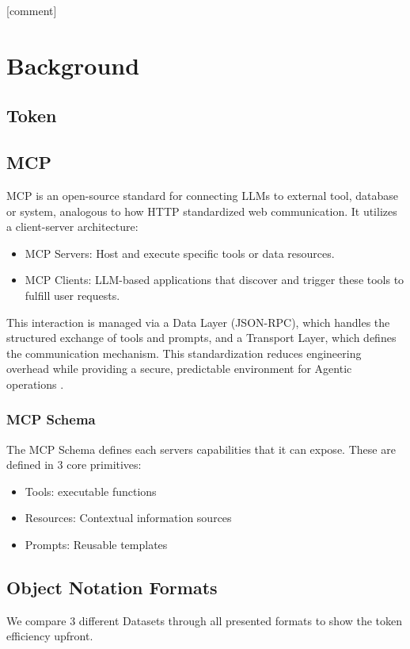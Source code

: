 \documentclass[10pt,twocolumn,letterpaper]{article}
\begin{document}
[comment]

\section{Background}
\subsection{Token}


\subsection{MCP}

MCP is an open-source standard for connecting LLMs to external tool, database or system, analogous to how HTTP standardized web communication. It utilizes a client-server architecture:

\begin{itemize}
    \item MCP Servers: Host and execute specific tools or data resources.
    \item MCP Clients: LLM-based applications that discover and trigger these tools to fulfill user requests.
\end{itemize}

This interaction is managed via a Data Layer (JSON-RPC), which handles the structured exchange of tools and prompts, and a Transport Layer, which defines the communication mechanism. This standardization reduces engineering overhead while providing a secure, predictable environment for Agentic operations \citep{mcp2026}. 

\subsubsection{MCP Schema}
The MCP Schema defines each servers capabilities that it can expose. These are defined in 3 core primitives:
\begin{itemize}
    \item Tools: executable functions
    \item Resources: Contextual information sources
    \item Prompts: Reusable templates
\end{itemize}


\subsection{Object Notation Formats}
We compare 3 different Datasets through all presented formats to show the token efficiency upfront.
\end{document}
